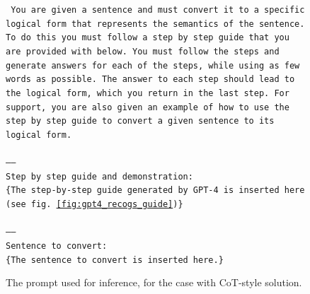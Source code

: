 \documentclass[11pt]{article}
\begin{document}
    \begin{figure}
        \small
        \texttt{
            You are given a sentence and must convert it to a specific logical form that
            represents the semantics of the sentence. To do this you must follow a step
            by step guide that you are provided with below. You must follow the steps and
            generate answers for each of the steps, while using as few words as possible.
            The answer to each step should lead to the logical form, which you return in
            the last step. For support, you are also given an example of how to use the
            step by step guide to convert a given sentence to its logical form.\\
            \\
            -----\\
            Step by step guide and demonstration:\\
            {\color{red}\{The step-by-step guide generated by GPT-4 is inserted here (see fig. \ref{fig:gpt4_recogs_guide})\}}\\
            \\
            -----\\
            Sentence to convert:\\
            {\color{red}\{The sentence to convert is inserted here.\}}
        }
        \caption{The prompt used for inference, for the case with CoT-style solution.}
        \label{fig:prompt_using_guide}
    \end{figure}
\end{document}
